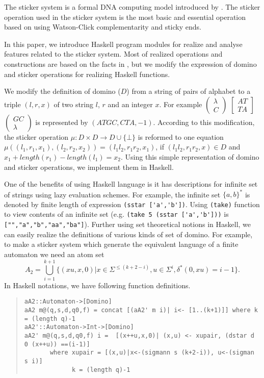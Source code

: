 The sticker system is a formal DNA computing model introduced by 
\cite{kari1998,paun1998}.
The sticker operation used in the sticker system  is the most 
basic and essential operation based on using Watson-Click 
complementarity and sticky ends.

In this paper, we introduce Haskell program modules for realize 
and analyse features related to the sticker system.
Most of realized operations and constructions are based on
the facts in \cite{paun1998}, but we modify the expression of
domino and sticker operations for realizing Haskell functions.

We modify the definition of domino ($D$) from a string of pairs
of alphabet to a triple $(l,r,x)$ of two string $l$, $r$
and an integer $x$.
For example 
$\left(\begin{array}{c} \lambda \\ C \end{array}\right)$
$\left[\begin{array}{c} AT \\ TA \end{array}\right]$
$\left(\begin{array}{c} GC \\ \lambda \end{array}\right)$
is represented by $(ATGC,CTA,-1)$.
According to this modification, the sticker operation 
$\mu:D \times D \to D \cup \{\bot\}$ is reformed to
one equation 
$\mu((l_1,r_1,x_1),(l_2,r_2,x_2)) =(l_1l_2,r_1r_2,x_1)$,
if $(l_1l_2,r_1r_2,x)\in D$ and 
$x_1+ length(r_1)-length(l_1) = x_2$.
Using this simple representation of domino and sticker operations,
we implement them in Haskell.

One of the benefits of using Haskell language 
is it has descriptions for infinite set of strings 
using lazy evaluation schemes.
For example, the infinite set $\{a,b\}^*$ is 
denoted by finite length of expression \verb|(sstar ['a','b'])|.
Using \verb|(take)| function to view contents of an infinite set
(e.g. \verb|(take 5 (sstar ['a','b']))| is \verb|["","a","b","aa","ba"]|).
Further using set theoretical notions in Haskell, we can easily
realize the definitions of various kinds of set of domino.
For example, to make a sticker system which generate the equivalent 
language of a finite automaton we need an atom set
$$
A_2 = \bigcup_{i=1}^{k+1} 
\{(xu,x,0)|x\in \Sigma^{\le (k+2-i)}, u\in \Sigma^i,
\delta^*(0,xu)=i-1 \}.
$$
In Haskell notations, we have following function definitions.
{\small
\begin{quote}
\begin{verbatim}
aA2::Automaton->[Domino]
aA2 m@(q,s,d,q0,f) = concat [(aA2' m i)| i<- [1..(k+1)]] where k = (length q)-1
aA2'::Automaton->Int->[Domino]
aA2' m@(q,s,d,q0,f) i =  [(x++u,x,0)| (x,u) <- xupair, (dstar d 0 (x++u)) ==(i-1)]
       where xupair = [(x,u)|x<-(sigmann s (k+2-i)), u<-(sigman s i)]
             k = (length q)-1
\end{verbatim}
\end{quote}
}

